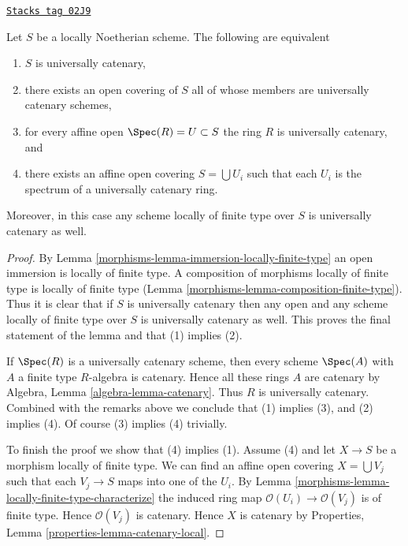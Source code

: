 \begin{lemma}
\label{morphisms-lemma-universally-catenary-local}
\href{https://stacks.math.columbia.edu/tag/02J9}{\texttt{Stacks tag 02J9}}

Let $S$ be a locally Noetherian scheme. The following are equivalent
\begin{enumerate}
\item $S$ is universally catenary,
\item there exists an open covering of $S$ all of whose members are
universally catenary schemes,
\item for every affine open $\Spec(R) = U \subset S$ the ring
$R$ is universally catenary, and
\item there exists an affine open covering $S = \bigcup U_i$ such
that each $U_i$ is the spectrum of a universally catenary ring.
\end{enumerate}
Moreover, in this case any scheme locally of finite type over $S$
is universally catenary as well.
\end{lemma}

\begin{proof}

By Lemma \ref{morphisms-lemma-immersion-locally-finite-type} an open immersion
is locally of finite type. A composition of morphisms locally of
finite type is locally of finite type
(Lemma \ref{morphisms-lemma-composition-finite-type}). Thus it is clear that if $S$ is
universally catenary then any open and any scheme locally of finite
type over $S$ is universally catenary as well. This proves the final
statement of the lemma and that (1) implies (2).

\medskip\noindent
If $\Spec(R)$ is a universally catenary scheme, then every
scheme $\Spec(A)$ with $A$ a finite type $R$-algebra is
catenary. Hence all these rings $A$ are catenary by
Algebra, Lemma \ref{algebra-lemma-catenary}.
Thus $R$ is universally catenary. Combined with the remarks above we
conclude that (1) implies (3), and (2) implies (4). Of course
(3) implies (4) trivially.

\medskip\noindent
To finish the proof we show that (4) implies (1).
Assume (4) and let $X \to S$ be a morphism locally of finite type.
We can find an affine open covering $X = \bigcup V_j$ such that
each $V_j \to S$ maps into one of the $U_i$. By
Lemma \ref{morphisms-lemma-locally-finite-type-characterize}
the induced ring map $\mathcal{O}(U_i) \to \mathcal{O}(V_j)$ is
of finite type. Hence $\mathcal{O}(V_j)$ is catenary. Hence
$X$ is catenary by Properties, Lemma \ref{properties-lemma-catenary-local}.
\end{proof}

